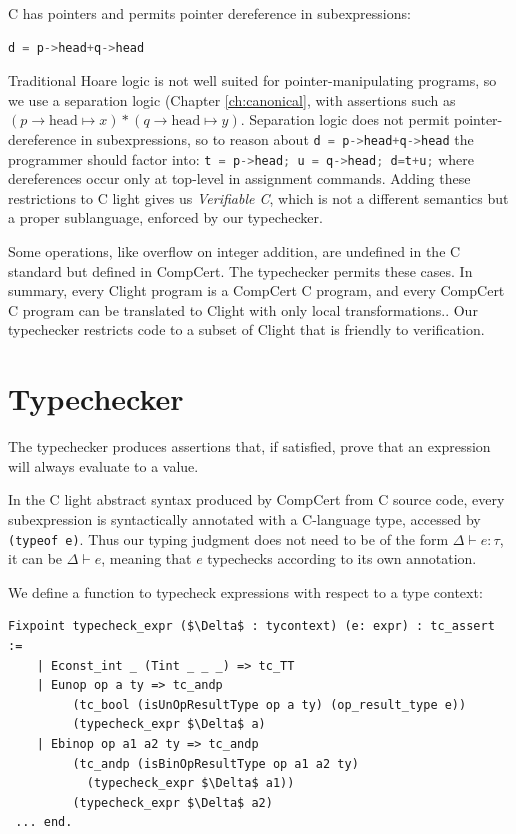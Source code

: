 \documentclass{puthesis}
\begin{document}
C has pointers and permits pointer dereference in subexpressions: 
\begin{lstlisting}[language=C]
d = p->head+q->head
\end{lstlisting}

Traditional Hoare logic is not well suited for pointer-manipulating programs,
so we use a separation logic (Chapter \ref{ch:canonical}, with assertions such as 
$(p\!\!\rightarrow \! \! \mathrm{head} \mapsto x) *(q \!\! \rightarrow \! \!
\mathrm{head} \mapsto y)$. Separation logic does not permit pointer-dereference
in subexpressions, so to reason about 
\lstinline[language=C]|d = p->head+q->head| 
the programmer should factor into:
\lstinline[language=c]|t = p->head; u = q->head; d=t+u;|
where dereferences occur only at top-level in assignment commands.
Adding these restrictions to C light gives us \emph{Verifiable C}, which is not
a different semantics but a proper sublanguage, enforced by our typechecker.


Some operations, like overflow on integer addition, are undefined in
the C standard but defined in CompCert. The typechecker
permits these cases. In summary, every Clight program is a CompCert C
program, and every CompCert C program can be translated to Clight with
only local transformations.. Our typechecker restricts code to a
subset of Clight that is friendly to verification.

\section{Typechecker} 
\label{sec:typechecker}
The typechecker produces assertions that, if satisfied, prove that an
expression will always evaluate to a value.  

In the C light abstract syntax produced by CompCert from C source code,
every subexpression is syntactically annotated
with a C-language type, accessed by \lstinline{(typeof e)}. 
Thus our typing judgment does not need to be of the
form $\Delta \vdash e : \tau$, it can be
$\Delta \vdash e $, meaning that $e$ typechecks according to its
own annotation.

We define a function to typecheck expressions with respect to a type context:
\pagebreak
\begin{lstlisting}
Fixpoint typecheck_expr ($\Delta$ : tycontext) (e: expr) : tc_assert :=
    | Econst_int _ (Tint _ _ _) => tc_TT 
    | Eunop op a ty => tc_andp 
         (tc_bool (isUnOpResultType op a ty) (op_result_type e)) 
         (typecheck_expr $\Delta$ a) 
    | Ebinop op a1 a2 ty => tc_andp 
         (tc_andp (isBinOpResultType op a1 a2 ty)  
           (typecheck_expr $\Delta$ a1)) 
         (typecheck_expr $\Delta$ a2)
 ... end.
\end{lstlisting}
\end{document}
